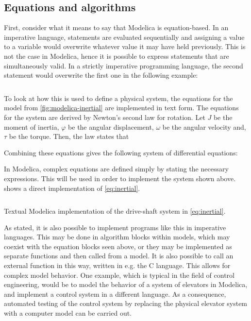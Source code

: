 \documentclass[\rootfolder/main.tex]{subfiles}
\begin{document}
\subsection{Equations and algorithms}

First, consider what it means to say that Modelica is equation-based.
In an imperative language, statements are evaluated sequentially and assigning a value to a variable would overwrite whatever value it may have held previously.
This is not the case in Modelica, hence it is possible to express statements that are simultaneously valid.
In a strictly imperative programming language, the second statement would overwrite the first one in the following example:

\inputminted{Modelica}{\rootfolder/Chapters/Chapter3/Listings/simultaneous.txt}

To look at how this is used to define a physical system, the equations for the model from \cref{fig:modelica-inertial} are implemented in text form.
The equations for the system are derived by Newton's second law for rotation.
Let $J$ be the moment of inertia, $\varphi$ be the angular displacement, $\omega$ be the angular velocity and, $\tau$ be the torque.
Then, the law states that


Combining these equations gives the following system of differential equations:


In Modelica, complex equations are defined simply by stating the necessary expressions.
This will be used in order to implement the system shown above.
 shows a direct implementation of \cref{eq:inertial}.

\begin{listing}[ht]
    \inputminted{Modelica}{\rootfolder/Models/MasterProject/Models/InertialCode.mo}
    \caption{Textual Modelica implementation of the drive-shaft system in \cref{eq:inertial}.\label{lst:modelica-inertial-code}}
\end{listing}

As stated, it is also possible to implement programs like this in imperative languages.
This may be done in algorithm blocks within models, which may coexist with the equation blocks seen above, or they may be implemented as separate functions and then called from a model.
It is also possible to call an external function in this way, written in e.g. the C language.
This allows for complex model behavior.
One example, which is typical in the field of control engineering, would be to model the behavior of a system of elevators in Modelica, and implement a control system in a different language.
As a consequence, automated testing of the control system by replacing the physical elevator system with a computer model can be carried out.
\end{document}
